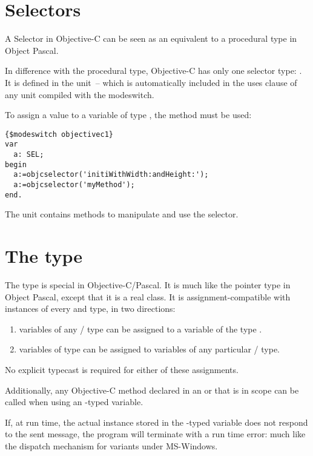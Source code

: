 \section{Selectors}
A Selector in Objective-C can be seen as an equivalent to a procedural type
in Object Pascal.

In difference with the procedural type, Objective-C has only one selector type:
. It is defined in the  unit~-- which is automatically
included in the uses clause of any unit compiled with the 
modeswitch.

To assign a value to a variable of type , the 
method must be used: 
\begin{verbatim}
{$modeswitch objectivec1}
var
  a: SEL;
begin
  a:=objcselector('initiWithWidth:andHeight:');
  a:=objcselector('myMethod');
end.
\end{verbatim}
The  unit contains methods to manipulate and use the selector.

\section{The  type}
The  type is special in Objective-C/Pascal. It is much like the pointer
type in Object Pascal, except that it is a real class. It is assignment-compatible
with instances of every  and  type, in two
directions:
\begin{enumerate}
\item variables of any / type can be
assigned to a variable of the type .
\item variables of type  can be assigned to variables of any particular
/ type.
\end{enumerate}
No explicit typecast is required for either of these assignments.

Additionally, any Objective-C method declared in an  or
 that is in scope can be called when using an
-typed variable.

If, at run time, the actual  instance stored in the
-typed variable does not respond to the sent message, the
program will terminate with a run time error: much like the dispatch
mechanism for variants under MS-Windows.

